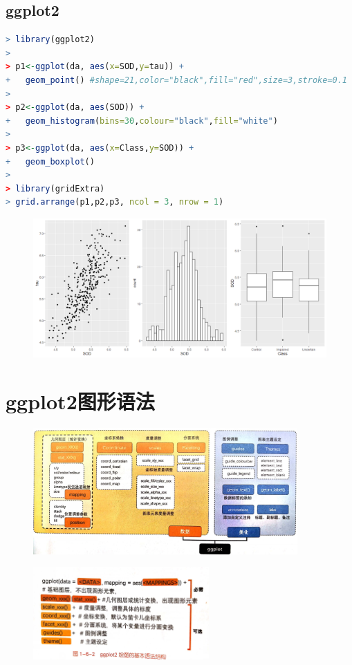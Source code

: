 \documentclass[11pt,a4paper,oneside]{book}
\begin{document}
\subsection{ggplot2}

\begin{lstlisting}[language=r]
> library(ggplot2)
> 
> p1<-ggplot(da, aes(x=SOD,y=tau)) + 
+   geom_point() #shape=21,color="black",fill="red",size=3,stroke=0.1
> 
> p2<-ggplot(da, aes(SOD)) + 
+   geom_histogram(bins=30,colour="black",fill="white")
> 
> p3<-ggplot(da, aes(x=Class,y=SOD)) + 
+   geom_boxplot() 
> 
> library(gridExtra) 
> grid.arrange(p1,p2,p3, ncol = 3, nrow = 1)
\end{lstlisting}
\begin{figure}[H]
	\centering
	\includegraphics[width=\textwidth]{screenshot033}
\end{figure}

\section{ggplot2图形语法}

\begin{figure}[H]
	\centering
	\includegraphics[width=0.9\textwidth]{screenshot005}
\end{figure}

\begin{figure}[H]
	\centering
	\includegraphics[width=0.6\textwidth]{screenshot016}
\end{figure}
%      
\end{document}
